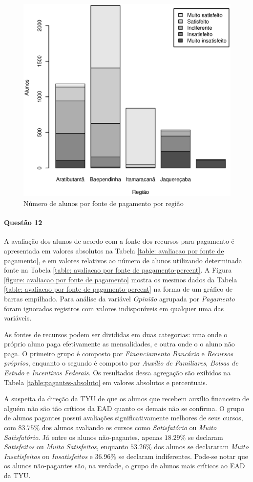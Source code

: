\documentclass[10pt,a4paper,oneside]{article}
\begin{document}
\begin{figure}[!h]
	\centering
	\includegraphics[width=.65\linewidth]{plots/stacked_pagamento_por_regiao.eps}
	\caption{Número de alunos por fonte de pagamento por região}
	\label{fig:fonte de pagamento absoluto}
\end{figure}

\FloatBarrier
\paragraph{Questão 12}

A avaliação dos alunos de acordo com a fonte dos recursos para pagamento é apresentada em valores absolutos na Tabela \ref{table: avaliacao por fonte de pagamento}, e em valores relativos ao número de alunos utilizando determinada fonte na Tabela \ref{table: avaliacao por fonte de pagamento-percent}. A Figura \ref{figure: avaliacao por fonte de pagamento} mostra os mesmos dados da Tabela \ref{table: avaliacao por fonte de pagamento-percent} na forma de um gráfico de barras empilhado. Para análise da variável \textit{Opinião} agrupada por \textit{Pagamento} foram ignorados registros com valores indisponíveis em qualquer uma das variáveis. 

As fontes de recursos podem ser divididas em duas categorias: uma onde o próprio aluno paga efetivamente as mensalidades, e outra onde o o aluno não paga. O primeiro grupo é composto por \textit{Financiamento Bancário} e \textit{Recursos próprios}, enquanto o segundo é composto por \textit{Auxílio de Familiares}, \textit{Bolsas de Estudo} e \textit{Incentivos Federais}. Os resultados dessa agregação são exibidos na Tabela \ref{table:pagantes-absoluto} em valores absolutos e percentuais.

A suspeita da direção da TYU de que os alunos que recebem auxílio financeiro de alguém não são tão críticos da EAD quanto os demais não se confirma. O grupo de alunos pagantes possui avaliações significativamente melhores de seus cursos, com $83.75\%$ dos alunos avaliando os cursos como \textit{Satisfatório} ou \textit{Muito Satisfatório}. Já entre os alunos não-pagantes, apenas $18.29\%$ se declaram \textit{Satisfeitos} ou \textit{Muito Satisfeitos}, enquanto $53.26\%$ dos alunos se declararam \textit{Muito Insatisfeitos} ou \textit{Insatisfeitos} e $36.96\%$ se declaram indiferentes. Pode-se notar que os alunos não-pagantes são, na verdade, o grupo de alunos mais críticos ao EAD da TYU.
\end{document}
